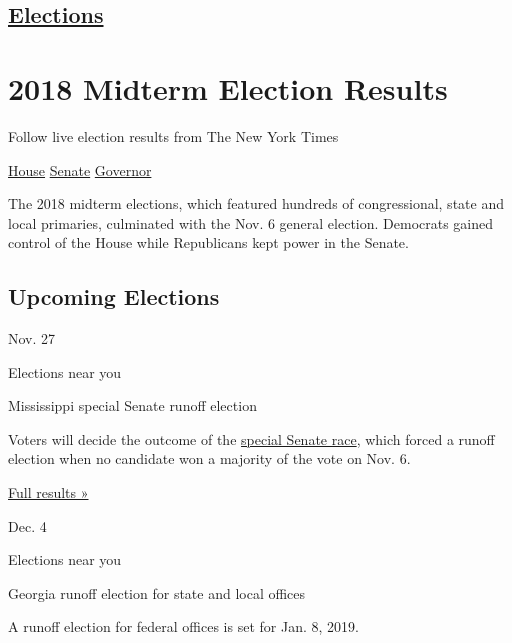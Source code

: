 \hypertarget{-elections-}{%
\subsection{\texorpdfstring{ \href{/news-event/2020-election}{Elections}
}{ Elections }}\label{-elections-}}

\hypertarget{2018-midterm-election-results}{%
\section{2018 Midterm Election
Results}\label{2018-midterm-election-results}}

Follow live election results from The New York Times

\href{https://www.nytimes3xbfgragh.onion/interactive/2018/11/06/us/elections/results-house-elections.html}{House}
\href{https://www.nytimes3xbfgragh.onion/interactive/2018/11/06/us/elections/results-senate-elections.html}{Senate}
\href{https://www.nytimes3xbfgragh.onion/interactive/2018/11/06/us/elections/results-governor-elections.html}{Governor}

The 2018 midterm elections, which featured hundreds of congressional,
state and local primaries, culminated with the Nov. 6 general election.
Democrats gained control of the House while Republicans kept power in
the Senate.

\hypertarget{upcoming-elections}{%
\subsection{Upcoming Elections}\label{upcoming-elections}}

Nov. 27

Elections near you

Mississippi special Senate runoff election

Voters will decide the outcome of the
\href{https://www.nytimes3xbfgragh.onion/elections/results/mississippi-senate-special}{special
Senate race}, which forced a runoff election when no candidate won a
majority of the vote on Nov. 6.

\href{https://www.nytimes3xbfgragh.onion/interactive/2018/11/27/us/elections/results-mississippi-senate-runoff-special-election.html}{Full
results »}

Dec. 4

Elections near you

Georgia runoff election for state and local offices

A runoff election for federal offices is set for Jan. 8, 2019.

